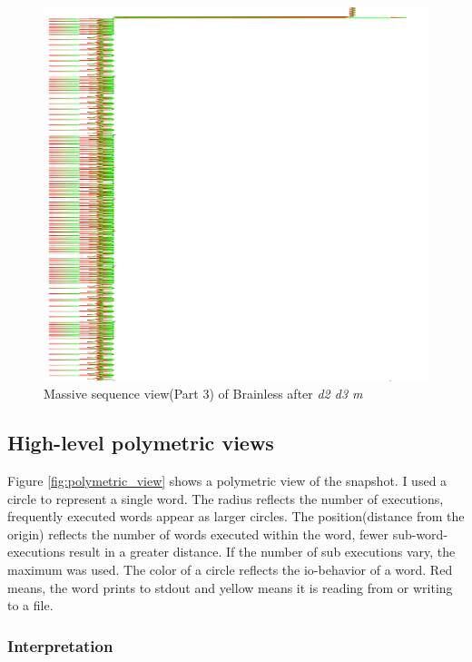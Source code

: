 \begin{figure}[p]
    \centering
    \includegraphics[scale=0.52]{graphics/massive_sequence_view-dir_file_word_3.png}
    \caption{Massive sequence view(Part 3) of Brainless after \emph{d2 d3 m}}
    \label{fig:massive_sequence_view_3}
\end{figure}

\subsection*{High-level polymetric views}

Figure \ref{fig:polymetric_view} shows a polymetric view of the snapshot. 
I used a circle to represent a single word. The radius reflects the number of executions, frequently executed words appear as larger circles. The position(distance from the origin) reflects the number of words executed within the word, fewer sub-word-executions result in a greater distance. If the number of sub executions vary, the maximum was used. The color of a circle reflects the io-behavior of a word. Red means, the word prints to stdout and yellow means it is reading from or writing to a file.

\subsubsection*{Interpretation}

